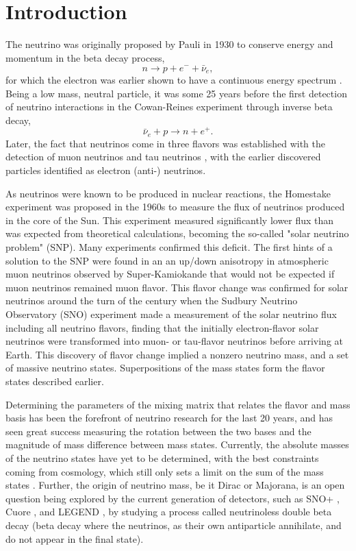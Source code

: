 \chapter{Introduction}
The neutrino was originally proposed by Pauli in 1930 \cite{pauli} to conserve energy and momentum in the beta decay process,
\begin{equation}
n \rightarrow p + e^- + \bar{\nu}_e,
\end{equation}
for which the electron was earlier shown to have a continuous energy spectrum \cite{chadwick}.
Being a low mass, neutral particle, it was some 25 years before the first detection of neutrino interactions in the Cowan-Reines experiment \cite{cowan-reines} through inverse beta decay,
\begin{equation}
\bar{\nu}_e + p \rightarrow n + e^+.
\end{equation}
Later, the fact that neutrinos come in three flavors was established with the detection of muon neutrinos \cite{danby} and tau neutrinos \cite{donut}, with the earlier discovered particles identified as electron (anti-) neutrinos.

As neutrinos were known to be produced in nuclear reactions, the Homestake experiment \cite{homestake} was proposed in the 1960s to measure the flux of neutrinos produced in the core of the Sun.
This experiment measured significantly lower flux than was expected from theoretical calculations, becoming the so-called "solar neutrino problem" (SNP).
Many experiments \cite{sage,gallex,gno} confirmed this deficit.
The first hints of a solution to the SNP were found in an an up/down anisotropy in atmospheric muon neutrinos observed by Super-Kamiokande \cite{superk} that would not be expected if muon neutrinos remained muon flavor. 
This flavor change was confirmed for solar neutrinos around the turn of the century when the Sudbury Neutrino Observatory (SNO) experiment \cite{3phase} made a measurement of the solar neutrino flux including all neutrino flavors, finding that the initially electron-flavor solar neutrinos were transformed into muon- or tau-flavor neutrinos before arriving at Earth.
This discovery of flavor change implied a nonzero neutrino mass, and a set of massive neutrino states.
Superpositions of the mass states form the flavor states described earlier.

Determining the parameters of the mixing matrix that relates the flavor and mass basis has been the forefront of neutrino research for the last 20 years, and has seen great success measuring the rotation between the two bases and the magnitude of mass difference between mass states. 
Currently, the absolute masses of the neutrino states have yet to be determined, with the best constraints coming from cosmology, which still only sets a limit on the sum of the mass states \cite{pdg}.
Further, the origin of neutrino mass, be it Dirac or Majorana, is an open question being explored by the current generation of detectors, such as SNO+ \cite{snop}, Cuore \cite{cuore}, and LEGEND \cite{legend}, by studying a process called neutrinoless double beta decay (beta decay where the neutrinos, as their own antiparticle annihilate, and do not appear in the final state).

